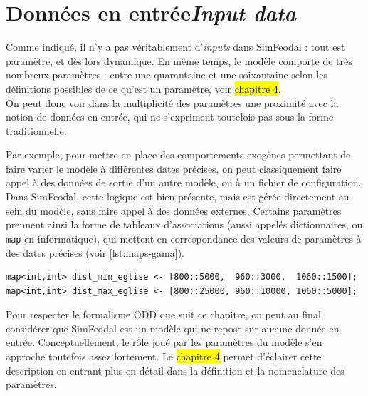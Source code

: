 \let\orisectionmark\sectionmark
\renewcommand\sectionmark[1]{}%
\section[Données en entrée -- \textit{Input data}]{Données en entrée\protect\newline \large{\textit{Input data}}}
\orisectionmark{Données en entrée}
\let\sectionmark\orisectionmark

Comme indiqué, il n'y a pas véritablement d'\textit{inputs} dans SimFeodal : tout est paramètre, et dès lors dynamique.
En même temps, le modèle comporte de très nombreux paramètres : entre une quarantaine et une soixantaine selon les définitions possibles de ce qu'est un paramètre, voir \hl{chapitre 4}.\\
On peut donc voir dans la multiplicité des paramètres une proximité avec la notion de données en entrée, qui ne s'expriment toutefois pas sous la forme traditionnelle.

Par exemple, pour mettre en place des comportements exogènes permettant de faire varier le modèle à différentes dates précises, on peut classiquement faire appel à des données de sortie d'un autre modèle, ou à un fichier de configuration.
Dans SimFeodal, cette logique est bien présente, mais est gérée directement au sein du modèle, sans faire appel à des données externes.
Certains paramètres prennent ainsi la forme de tableaux d'associations (aussi appelés dictionnaires, ou \og \texttt{map}\fg{} en informatique), qui mettent en correspondance des valeurs de paramètres à des dates précises (voir \cref{lst:maps-gama}).
\medskip

{\footnotesize
\begin{lstlisting}[caption={
Deux exemples de \texttt{map} dans Gama.
\textit{À partir de 800, les églises doivent se situer entre 5 et 25~km, puis entre 3 et 10~km de 960 à 1060, et entre 1.5 et 5~km après cette date.}}, captionpos=b, label={lst:maps-gama}]
map<int,int> dist_min_eglise <- [800::5000,  960::3000,  1060::1500];
map<int,int> dist_max_eglise <- [800::25000, 960::10000, 1060::5000]; 
\end{lstlisting}
}

Pour respecter le formalisme ODD que suit ce chapitre, on peut au final considérer que SimFeodal est un modèle qui ne repose sur aucune donnée en entrée.
Conceptuellement, le rôle joué par les paramètres du modèle s'en approche toutefois assez fortement.
Le \hl{chapitre 4} permet d'éclairer cette description en entrant plus en détail dans la définition et la nomenclature des paramètres.

